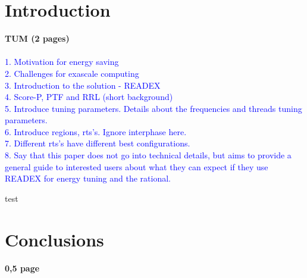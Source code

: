 \documentclass[runningheads]{llncs}
\begin{document}
\section{Introduction} \label{sec:introduction}
\textbf{TUM (2 pages)} \\ \\
\textcolor{blue}{1. Motivation for energy saving \\
2. Challenges for exascale computing \\
3. Introduction to the solution - READEX \\
4. Score-P, PTF and RRL (short background) \\
5. Introduce tuning parameters. Details about the frequencies and threads tuning parameters.  \\
6. Introduce regions, rts's. Ignore interphase here. \\
7. Different rts's have different best configurations. \\
8. Say that this paper does not go into technical details, but aims to provide a general guide to interested users about what they can expect if they use READEX for energy tuning and the rational. }


test

















\section{Conclusions} \label{sec:conclusions}
\textbf{0,5 page}



%
 
 
\end{document}
